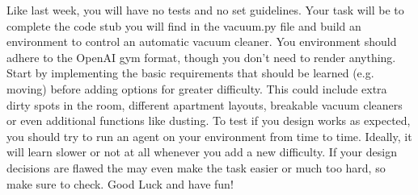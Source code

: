 \documentclass{exam}
\begin{document}
\noindent Like last week, you will have no tests and no set guidelines. Your task will be to complete the code stub you will find in the vacuum.py file and build an environment to control an automatic vacuum cleaner.
You environment should adhere to the OpenAI gym format, though you don't need to render anything. Start by implementing the basic requirements that should be learned (e.g. moving) before adding options for greater difficulty. This could include extra dirty spots in the room, different apartment layouts, breakable vacuum cleaners or even additional functions like dusting.
To test if you design works as expected, you should try to run an agent on your environment from time to time. 
Ideally, it will learn slower or not at all whenever you add a new difficulty. If your design decisions are flawed the may even make the task easier or much too hard, so make sure to check. Good Luck and have fun!
\end{document}

